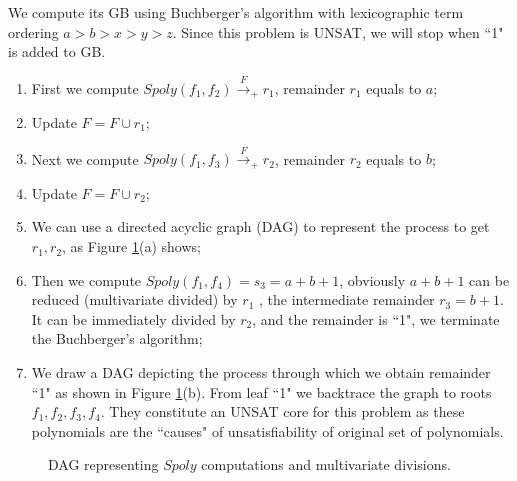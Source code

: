 \begin{Example}
\vspace{0.1in}
We compute its GB using Buchberger's algorithm with lexicographic term ordering $a>b>x>y>z$.
Since this problem is UNSAT, we will stop when ``1" is added to GB.
\begin{enumerate}[{1)}]
\item First we compute $Spoly(f_1,f_2)\xrightarrow{F}_{+} r_1$, remainder $r_1$ equals to $a$;
\item Update $F=F\cup r_1$;
\item Next we compute $Spoly(f_1,f_3)\xrightarrow{F}_{+} r_2$, remainder $r_2$ equals to $b$;
\item Update $F=F\cup r_2$;
\item We can use a directed acyclic graph (DAG) to represent the process to get $r_1,r_2$, as Figure \ref{fig:originUNSAT}(a) shows;
\item Then we compute $Spoly(f_1,f_4) = s_3= a+b+1$, obviously $a+b+1$ can be reduced (multivariate divided) by
$r_1$ , the intermediate remainder $r_3 = b+1$. It can be immediately divided by $r_2$, and the remainder is ``1", we
terminate the Buchberger's algorithm;
\item We draw a DAG depicting the process through which we obtain remainder ``1" as shown in Figure \ref{fig:originUNSAT}(b). 
From leaf ``1" we backtrace the graph to roots $f_1,f_2,f_3,f_4$. They constitute an UNSAT core for this problem
as these polynomials are the ``causes" of unsatisfiability of original set of polynomials.
\end{enumerate}
\end{Example}

\begin{figure}[bp]
\caption{DAG representing $Spoly$ computations and multivariate divisions.}
\label{fig:originUNSAT}
\end{figure}

